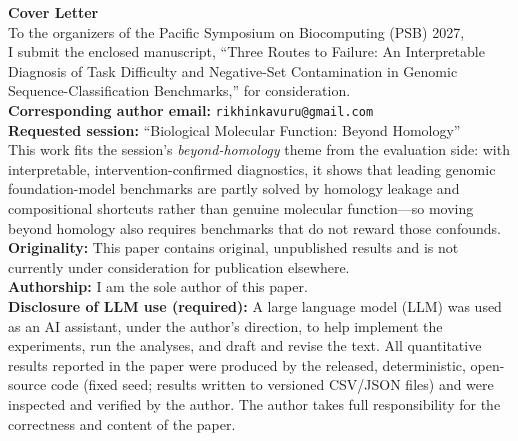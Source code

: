 \documentclass{ws-procs11x85}
\begin{document}
\thispagestyle{empty}
\noindent\textbf{\large Cover Letter}\\[6pt]
\noindent To the organizers of the Pacific Symposium on Biocomputing (PSB) 2027,\\[6pt]

\noindent I submit the enclosed manuscript, ``Three Routes to Failure: An Interpretable
Diagnosis of Task Difficulty and Negative-Set Contamination in Genomic
Sequence-Classification Benchmarks,'' for consideration.\\[6pt]

\noindent\textbf{Corresponding author email:} \texttt{rikhinkavuru@gmail.com}\\[3pt]
\noindent\textbf{Requested session:} ``Biological Molecular Function: Beyond Homology''\\[3pt]
\noindent This work fits the session's \emph{beyond-homology} theme from the evaluation side: with interpretable, intervention-confirmed diagnostics, it shows that leading genomic foundation-model benchmarks are partly solved by homology leakage and compositional shortcuts rather than genuine molecular function---so moving beyond homology also requires benchmarks that do not reward those confounds.\\[3pt]
\noindent\textbf{Originality:} This paper contains original, unpublished results and is not currently under
consideration for publication elsewhere.\\[3pt]
\noindent\textbf{Authorship:} I am the sole author of this paper.\\[3pt]
\noindent\textbf{Disclosure of LLM use (required):} A large language model (LLM) was used as an
AI assistant, under the author's direction, to help implement the experiments, run the analyses,
and draft and revise the text. All quantitative results reported in the paper were produced by the
released, deterministic, open-source code (fixed seed; results written to versioned CSV/JSON files)
and were inspected and verified by the author. The author takes full responsibility for the
correctness and content of the paper.\\[6pt]
\end{document}
